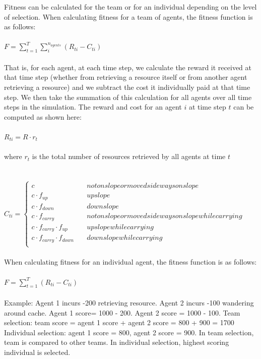 \documentclass[12pt]{article}  %
\begin{document}
Fitness can be calculated for the team or for an individual depending on the level of selection.
When calculating fitness for a team of agents, the fitness function is as follows:\\ 
\\
$F = \sum_{t=1}^{T} \sum_{i}^{n_{agents}} (R_{ti} - C_{ti}) $\\
\\
That is, for each agent, at each time step, we calculate the reward it received at that time step (whether from retrieving a resource itself or from another agent retrieving a resource) and we subtract the cost it individually paid at that time step. 
We then take the summation of this calculation for all agents over all time steps in the simulation.
The reward and cost for an agent $i$ at time step $t$ can be computed as shown here:\\
\\
$
R_{ti} = R \cdot r_{t}
$\\
\\
where $r_t$ is the total number of resources retrieved by all agents at time $t$
\\
\\
\\
$
C_{ti} = \left\{
        \begin{array}{ll}
            c & \quad not on slope or moved sideways on slope\\
            c \cdot f_{up} & \quad up slope\\
            c \cdot f_{down} & \quad down slope\\
            c \cdot f_{carry} & \quad not on slope or moved sideways on slope while carrying\\
            c \cdot f_{carry} \cdot f_{up} & \quad up slope while carrying \\
            c \cdot f_{carry} \cdot f_{down} & \quad down slope while carrying\\
        \end{array}
    \right.
$
\\
\\
When calculating fitness for an individual agent, the fitness function is as follows:\\
\\
$F = \sum_{t=1}^{T} (R_{ti} - C_{ti}) $
\\
\\
Example: Agent 1 incurs -200 retrieving resource. 
Agent 2 incurs -100 wandering around cache. 
Agent 1 score= 1000 - 200. 
Agent 2 score = 1000 - 100.
Team selection: team score = agent 1 score + agent 2 score = 800 + 900 = 1700
Individual selection: agent 1 score = 800, agent 2 score = 900. 
In team selection, team is compared to other teams. 
In individual selection, highest scoring individual is selected. 
\end{document}
